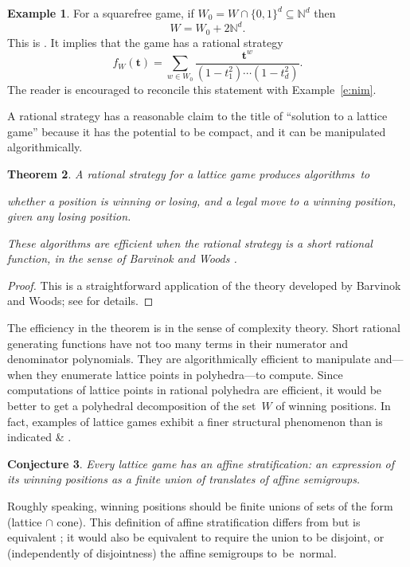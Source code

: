 \documentclass[12pt]{amsart}
\numberwithin{equation}{section}
\newtheorem{thm}{Theorem}[section]
\newtheorem{conj}[thm]{Conjecture}
\theoremstyle{definition}
\newtheorem{example}[thm]{Example}
\begin{document}
\begin{example}\label{e:squarefree}
For a squarefree game, if\/ $W_0 = W \cap \{0,1\}^d \subseteq {\mathbb{N}}^d$
then
$$  W = W_0 + 2{\mathbb{N}}^d.
$$
This is \cite[Theorem~6.11]{latticeGames}.  It implies that the game
has a rational strategy
$$  f_W({\mathbf{t}}) = \sum_{w\in W_0} \frac{{\mathbf{t}}^w}{(1-t_1^2)\cdots(1-t_d^2)}.
$$
The reader is encouraged to reconcile this statement with
Example~\ref{e:nim}.
\end{example}

A rational strategy has a reasonable claim to the title of ``solution
to a lattice game'' because it has the potential to be compact, and it
can be manipulated algorithmically.

\begin{thm}\label{t:rational}
A rational strategy for a lattice game produces algorithms~to
\begin{itemize}
\itemdetermine whether a position is winning or losing, and
\itemcompute a legal move to a winning position, given any losing
position.
\end{itemize}
These algorithms are efficient when the rational strategy is a
\emph{short} rational function, in the sense of Barvinok and Woods
\cite{bw03}.
\end{thm}
\begin{proof}
This is a straightforward application of the theory developed by
Barvinok and Woods; see \cite{algsCGT} for details.
\end{proof}

The efficiency in the theorem is in the sense of complexity theory.
Short rational generating functions have not too many terms in their
numerator and denominator polynomials.  They are algorithmically
efficient to manipulate and---when they enumerate lattice points in
polyhedra---to compute.  Since computations of lattice points in
rational polyhedra are efficient, it would be better to get a
polyhedral decomposition of the set~$W$ of winning positions.  In
fact, examples of lattice games exhibit a finer structural phenomenon
than is indicated \cite[Conjecture~8.9]{latticeGames} \&
\cite{commAlgCGT}.

\begin{conj}\label{c:affineStrat}
Every lattice game has an \emph{affine stratification}: an expression
of its winning positions as a finite union of translates of affine
semigroups.
\end{conj}

Roughly speaking, winning positions should be finite unions of sets of
the form (lattice $\cap$ cone).  This definition of affine
stratification differs from \cite[Definition~8.6]{latticeGames} but is
equivalent \cite[Theorem~2.6]{affineStrat}; it would also be
equivalent to require the union to be disjoint, or (independently of
disjointness) the affine semigroups to~be~normal.
\end{document}
